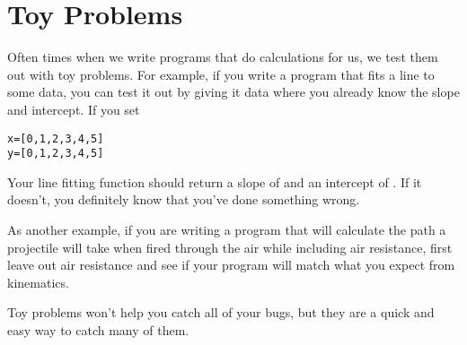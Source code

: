 \section{Toy Problems}
Often times when we write programs that do calculations for us, we test them out with toy problems.  For example, if you write a program that fits a line to some data, you can test it out by giving it data where you already know the slope and intercept.  If you set
\begin{Verbatim}
x=[0,1,2,3,4,5]
y=[0,1,2,3,4,5]
\end{Verbatim}
Your line fitting function should return a slope of  and an intercept of . If it doesn't, you definitely know that you've done something wrong.

As another example, if you are writing a program that will calculate the path a projectile will take when fired through the air while including air resistance, first leave out air resistance and see if your program will match what you expect from kinematics.

Toy problems won't help you catch all of your bugs, but they are a quick and easy way to catch many of them.

